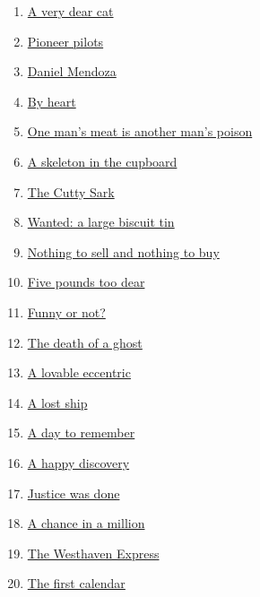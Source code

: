\documentclass[11pt]{article}
\begin{document}
\begin{multicols}{2}
\begin{enumerate}
		\item \href{https://mp.weixin.qq.com/s/0729tiXi6MIod069nOV3ng}{A very dear cat}	%
		\item \href{https://mp.weixin.qq.com/s/3ZJv0HBKrk1EqqQKiuCcKw}{Pioneer pilots}	%
		\item \href{https://mp.weixin.qq.com/s/2X0iRyAVVThDeVeKHqNFsw}{Daniel Mendoza}	%
		\item \href{https://mp.weixin.qq.com/s/atwvYwsuUCL-QfMnZqrzIw}{By heart}	%
		\item \href{https://mp.weixin.qq.com/s/1yg_8NDMb4VLms6hOqWqiw}{One man's meat is another man's poison}	%
		\item \href{https://mp.weixin.qq.com/s/5tT8Il7gsPxhgqoY9Hppsw}{A skeleton in the cupboard}	%
		\item \href{https://mp.weixin.qq.com/s/rj6WEQf3wtWl11EKrH3F_Q}{The Cutty Sark}	%
		\item \href{https://mp.weixin.qq.com/s/RyFqS170U5qhnwsKlnasDg}{Wanted: a large biscuit tin}	%
		\item \href{https://mp.weixin.qq.com/s/Rm-Z7Qltz8jgQmBcO9ZM-Q}{Nothing to sell and nothing to buy}	%
		\item \href{https://mp.weixin.qq.com/s/4NjsilLbuzi2Nwhi_FQiLQ}{Five pounds too dear}	%
		\item \href{https://mp.weixin.qq.com/s/-JDVsZQMPo-FmYaohNWXJw}{Funny or not?}	%
		\item \href{https://mp.weixin.qq.com/s/J4D26pIBOghCrh5FAMQUBQ}{The death of a ghost}	%
		\item \href{https://mp.weixin.qq.com/s/avlNjhm9bNAbxxfPY4iixQ}{A lovable eccentric}	%
		\item \href{https://mp.weixin.qq.com/s/m7Rty38Ol8awdDQ7KxOBrQ}{A lost ship}	%
		\item \href{https://mp.weixin.qq.com/s/a4-IsMbdhi3qFgCrD1tr4w}{A day to remember}	%
		\item \href{https://mp.weixin.qq.com/s/JMBT-hm8fyaSjtomldCdgg}{A happy discovery}	%
		\item \href{https://mp.weixin.qq.com/s/Y-2SR-I8xF8jwekPTMfYsg}{Justice was done}	%
		\item \href{https://mp.weixin.qq.com/s/HUGPBE2zuHMcibx55DAU-g}{A chance in a million}	%
		\item \href{https://mp.weixin.qq.com/s/jULXhPW_niY_Eiw7vYkXuw}{The Westhaven Express}	%
		\item \href{https://mp.weixin.qq.com/s/EjRepcuMXs_Y1KUzspM3fA}{The first calendar}	%

\end{enumerate}
\end{multicols}
\end{document}

